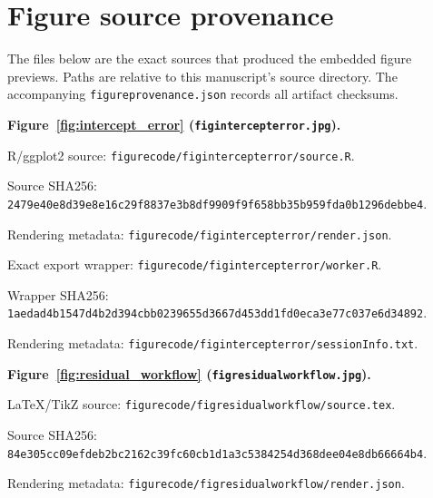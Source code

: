 \documentclass[11pt]{article}
\begin{document}
\clearpage
\section*{Figure source provenance}
The files below are the exact sources that produced the embedded figure previews. Paths are relative to this manuscript's source directory. The accompanying \texttt{figureprovenance.json} records all artifact checksums.\par
\medskip\noindent\textbf{Figure~\ref{fig:intercept_error} (\texttt{figintercepterror.jpg}).}\par
\noindent R/ggplot2 source: \texttt{figurecode/\allowbreak{}figintercepterror/\allowbreak{}source.R}.\par
\noindent Source SHA256: \texttt{2479e40e\allowbreak{}8d39e8e1\allowbreak{}6c29f883\allowbreak{}7e3b8df9\allowbreak{}909f9f65\allowbreak{}8bb35b95\allowbreak{}9fda0b12\allowbreak{}96debbe4}.\par
\noindent Rendering metadata: \texttt{figurecode/\allowbreak{}figintercepterror/\allowbreak{}render.json}.\par
\noindent Exact export wrapper: \texttt{figurecode/\allowbreak{}figintercepterror/\allowbreak{}worker.R}.\par
\noindent Wrapper SHA256: \texttt{1aedad4b\allowbreak{}1547d4b2\allowbreak{}d394cbb0\allowbreak{}239655d3\allowbreak{}667d453d\allowbreak{}d1fd0eca\allowbreak{}3e77c037\allowbreak{}e6d34892}.\par
\noindent Rendering metadata: \texttt{figurecode/\allowbreak{}figintercepterror/\allowbreak{}sessionInfo.txt}.\par
\medskip\noindent\textbf{Figure~\ref{fig:residual_workflow} (\texttt{figresidualworkflow.jpg}).}\par
\noindent LaTeX/TikZ source: \texttt{figurecode/\allowbreak{}figresidualworkflow/\allowbreak{}source.tex}.\par
\noindent Source SHA256: \texttt{84e305cc\allowbreak{}09efdeb2\allowbreak{}bc2162c3\allowbreak{}9fc60cb1\allowbreak{}d1a3c538\allowbreak{}4254d368\allowbreak{}dee04e8d\allowbreak{}b66664b4}.\par
\noindent Rendering metadata: \texttt{figurecode/\allowbreak{}figresidualworkflow/\allowbreak{}render.json}.\par
\end{document}
